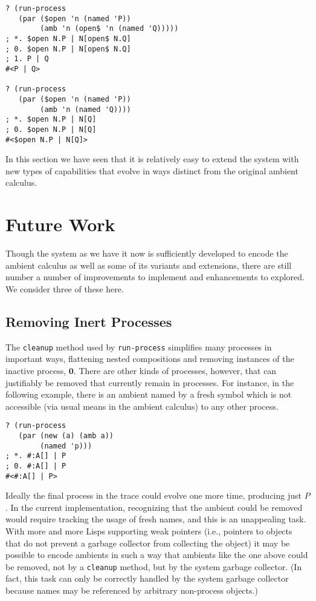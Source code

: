 \documentclass[12pt]{article}
\begin{document}
\begin{verbatim}
? (run-process
   (par ($open 'n (named 'P))
        (amb 'n (open$ 'n (named 'Q)))))
; *. $open N.P | N[open$ N.Q]
; 0. $open N.P | N[open$ N.Q]
; 1. P | Q
#<P | Q>

? (run-process
   (par ($open 'n (named 'P))
        (amb 'n (named 'Q))))
; *. $open N.P | N[Q]
; 0. $open N.P | N[Q]
#<$open N.P | N[Q]>
\end{verbatim}

In this section we have seen that it is relatively easy to extend the system with new types of capabilities that evolve in ways distinct from the original ambient calculus.

\section{Future Work}
\label{sec:future-work}

Though the system as we have it now is sufficiently developed to encode the ambient calculus as well as some of its variants and extensions, there are still number a number of improvements to implement and enhancements to explored.
We consider three of these here.

\subsection{Removing Inert Processes}
\label{sec:removing-inert-processes}

The \texttt{cleanup} method used by \texttt{run-process} simplifies many processes in important ways, flattening nested compositions and removing instances of the inactive process, $\mathbf{0}$.
There are other kinds of processes, however, that can justifiably be removed that currently remain in processes.
For instance, in the following example, there is an ambient named by a fresh symbol which is not accessible (via usual means in the ambient calculus) to any other process.

\begin{verbatim}
? (run-process
   (par (new (a) (amb a))
        (named 'p)))
; *. #:A[] | P
; 0. #:A[] | P
#<#:A[] | P>
\end{verbatim}

Ideally the final process in the trace could evolve one more time, producing just $P$.
In the current implementation, recognizing that the ambient could be removed would require tracking the usage of fresh names, and this is an unappealing task.
With more and more Lisps supporting weak pointers (i.e., pointers to objects that do not prevent a garbage collector from collecting the object) it may be possible to encode ambients in such a way that ambients like the one above could be removed, not by a \texttt{cleanup} method, but by the system garbage collector.
(In fact, this task can only be correctly handled by the system garbage collector because names may be referenced by arbitrary non-process objects.)
\end{document}
